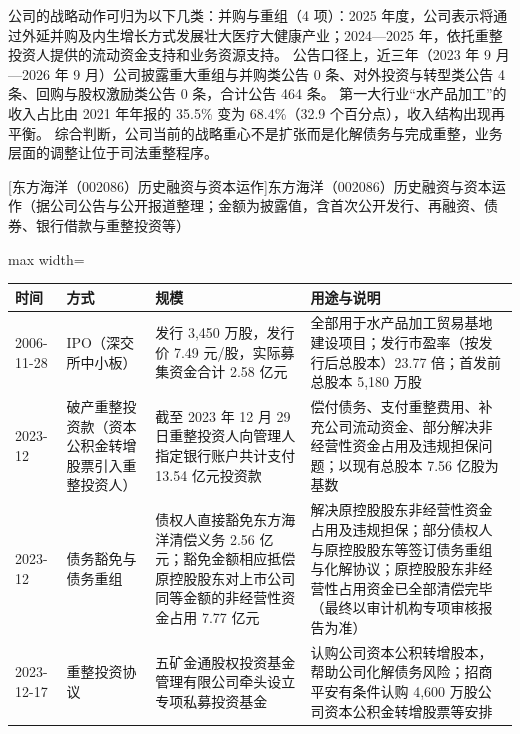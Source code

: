  公司的战略动作可归为以下几类：并购与重组（4 项）：2025 年度，公司表示将通过外延并购及内生增长方式发展壮大医疗大健康产业；2024---2025 年，依托重整投资人提供的流动资金支持和业务资源支持。 公告口径上，近三年（2023 年 9 月---2026 年 9 月）公司披露重大重组与并购类公告 0 条、对外投资与转型类公告 4 条、回购与股权激励类公告 0 条，合计公告 464 条。 第一大行业“水产品加工”的收入占比由 2021 年年报的 35.5\% 变为 68.4\%（32.9 个百分点），收入结构出现再平衡。 综合判断，公司当前的战略重心不是扩张而是化解债务与完成重整，业务层面的调整让位于司法重整程序。

\begin{center}\small\setlength{\tabcolsep}{4pt}
[东方海洋（002086）历史融资与资本运作]{东方海洋（002086）历史融资与资本运作（据公司公告与公开报道整理；金额为披露值，含首次公开发行、再融资、债券、银行借款与重整投资等）}
\begin{adjustbox}{max width=\textwidth}
\begin{tabular}{@{}p{1.45cm}p{2.55cm}p{4.05cm}p{4.95cm}@{}}
\toprule
时间 & 方式 & 规模 & 用途与说明 \\
\midrule
2006-11-28 & IPO（深交所中小板） & 发行 3,\allowbreak{}450 万股，\allowbreak{}发行价 7.49 元/\allowbreak{}股，\allowbreak{}实际募集资金合计 2.58 亿元 & 全部用于水产品加工贸易基地建设项目；发行市盈率（按发行后总股本）23.77 倍；首发前总股本 5,\allowbreak{}180 万股 \\
2023-12 & 破产重整投资款（资本公积金转增股票引入重整投资人） & 截至 2023 年 12 月 29 日重整投资人向管理人指定银行账户共计支付 13.54 亿元投资款 & 偿付债务、\allowbreak{}支付重整费用、\allowbreak{}补充公司流动资金、\allowbreak{}部分解决非经营性资金占用及违规担保问题；以现有总股本 7.56 亿股为基数 \\
2023-12 & 债务豁免与债务重组 & 债权人直接豁免东方海洋清偿义务 2.56 亿元；豁免金额相应抵偿原控股股东对上市公司同等金额的非经营性资金占用 7.77 亿元 & 解决原控股股东非经营性资金占用及违规担保；部分债权人与原控股股东等签订债务重组与化解协议；原控股股东非经营性占用资金已全部清偿完毕（最终以审计机构专项审核报告为准） \\
2023-12-17 & 重整投资协议 & 五矿金通股权投资基金管理有限公司牵头设立专项私募投资基金 & 认购公司资本公积转增股本，\allowbreak{}帮助公司化解债务风险；招商平安有条件认购 4,\allowbreak{}600 万股公司资本公积金转增股票等安排 \\
\bottomrule
\end{tabular}
\end{adjustbox}
\end{center}

